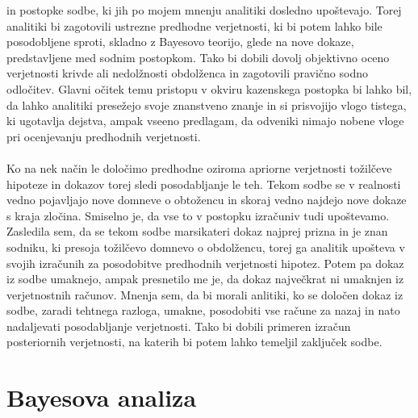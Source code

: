 \documentclass[12pt,a4paper]{amsart}
\theoremstyle{definition} %
\theoremstyle{plain} %
\begin{document}
in postopke sodbe, ki jih po mojem mnenju analitiki dosledno upoštevajo. Torej analitiki bi zagotovili ustrezne predhodne verjetnosti, ki bi potem lahko bile posodobljene sproti, skladno z 
Bayesovo teorijo, glede na nove dokaze, predstavljene med sodnim postopkom. Tako bi dobili dovolj objektivno oceno verjetnosti krivde ali nedolžnosti 
obdolženca in zagotovili pravično sodno odločitev. Glavni očitek temu pristopu v okviru kazenskega postopka bi lahko bil, da lahko analitiki presežejo svoje znanstveno 
znanje in si prisvojijo vlogo tistega, ki ugotavlja dejstva, ampak vseeno predlagam, da odveniki nimajo nobene vloge pri ocenjevanju predhodnih verjetnosti.\\\\
Ko na nek način le določimo predhodne oziroma apriorne verjetnosti tožilčeve hipoteze in dokazov torej sledi posodabljanje le teh. Tekom sodbe se v realnosti vedno 
pojavljajo nove domneve o obtožencu in skoraj vedno najdejo nove dokaze s kraja zločina. Smiselno je, da vse to v postopku izračuniv tudi upoštevamo. Zasledila sem, da 
se tekom sodbe marsikateri dokaz najprej prizna in je znan sodniku, ki presoja tožilčevo domnevo o obdolžencu, torej ga analitik upošteva v svojih izračunih za posodobitve 
predhodnih verjetnosti hipotez. Potem pa dokaz iz sodbe umaknejo, ampak presnetilo me je, da dokaz največkrat ni umaknjen iz verjetnostnih računov. Mnenja sem, da bi 
morali anlitiki, ko se določen dokaz iz sodbe, zaradi tehtnega razloga, umakne, posodobiti vse račune za nazaj in nato nadaljevati posodabljanje verjetnosti. Tako bi 
dobili primeren izračun posteriornih verjetnosti, na katerih bi potem lahko temeljil zaključek sodbe. 

\section{Bayesova analiza}
\end{document}
